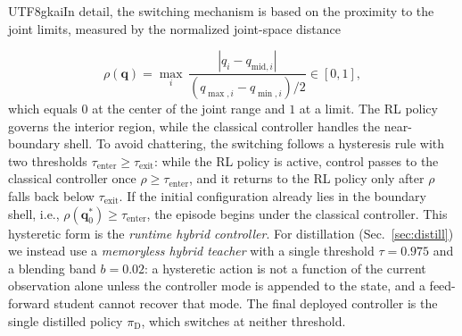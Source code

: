 \documentclass[journal, twoside]{IEEEtran}
\newcommand{\xinyi}[1]{{\color{darkorange}\begin{CJK*}{UTF8}{gkai}#1\end{CJK*}}}
\newcommand{\rev}[1]{\begingroup\color{magenta}#1\endgroup}
\newcommand{\rst}[1]{{\color{rstcolor}#1}}
\begin{document}
\xinyi{In detail, the switching mechanism is based on the proximity to the joint limits, measured by the normalized joint-space distance}
\begin{equation}
\label{eq:rho}
\rho(\mathbf{q}) = \max_{i}\,\frac{|q_{i}-q_{\mathrm{mid},i}|}{(q_{\max,i}-q_{\min,i})/2}\in[0,1],
\end{equation}
which equals $0$ at the center of the joint range and $1$ at a limit. The RL policy governs the interior region, while the classical controller handles the near-boundary shell. To avoid chattering, the switching follows a hysteresis rule with two thresholds $\tau_{\mathrm{enter}}\ge\tau_{\mathrm{exit}}$: while the RL policy is active, control passes to the classical controller once $\rho\ge\tau_{\mathrm{enter}}$, and it returns to the RL policy only after $\rho$ falls back below $\tau_{\mathrm{exit}}$. If the initial configuration already lies in the boundary shell, i.e., $\rho(\mathbf{q}_{0}^{*})\ge\tau_{\mathrm{enter}}$, the episode begins under the classical controller. \rst{This hysteretic form is the \emph{runtime hybrid controller}. For distillation (Sec.~\ref{sec:distill}) we instead use a \emph{memoryless hybrid teacher} with a single threshold $\tau{=}0.975$ and a blending band $b{=}0.02$: a hysteretic action is not a function of the current observation alone unless the controller mode is appended to the state, and a feed-forward student cannot recover that mode. The final deployed controller is the single distilled policy $\pi_{\mathrm{D}}$, which switches at neither threshold.}
\end{document}
